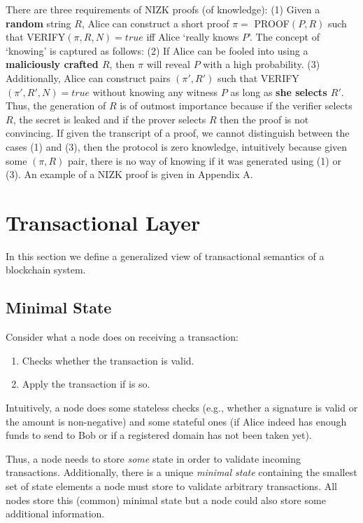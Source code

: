 \documentclass[]{report}   %
\begin{document}
\begin{enumerate}
	There are three requirements of NIZK proofs (of knowledge): (1) Given a \textbf{random} string $R$, Alice can construct a short proof $\pi=$ PROOF$(P, R)$ such that VERIFY$(\pi, R, N)=true$ iff Alice `really knows $P$'. The concept of `knowing' is captured as follows: (2) If Alice can be fooled into using a \textbf{maliciously crafted $R$}, then $\pi$ will reveal $P$ with a high probability. (3) Additionally, Alice can construct pairs $(\pi', R')$ such that VERIFY$(\pi', R', N) = true$ without knowing any witness $P$ as long as \textbf{she selects $R'$}. Thus, the generation of $R$ is of outmost importance because if the verifier selects $R$, the secret is leaked and if the prover selects $R$ then the proof is not convincing. If given the transcript of a proof, we cannot distinguish between the cases (1) and (3), then the protocol is zero knowledge, intuitively because given some $(\pi, R)$ pair, there is no way of knowing if it was generated using (1) or (3). An example of a NIZK proof is given in Appendix A.
\end{enumerate}



\section{Transactional Layer}

In this section we define a generalized view of transactional semantics of a blockchain system. %

\subsection{Minimal State}
\label{min-state}
	Consider what a node does on receiving a transaction:

    \begin{enumerate}
		\item Checks whether the transaction is valid.
		\item Apply the transaction if is so.
    \end{enumerate}

	Intuitively, a node does some stateless checks (e.g., whether a signature is valid or the amount is non-negative) and some stateful ones (if Alice indeed has enough funds to send to Bob or if a registered domain has not been taken yet). 

	Thus, a node needs to store {\em some} state in order to validate incoming transactions. Additionally, there is a unique \textit{minimal state} containing the smallest set of state elements a node must store to validate arbitrary transactions. All nodes store this (common) minimal state but a node could also store some additional information. %
\end{document}
